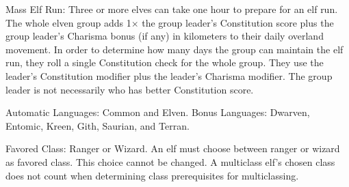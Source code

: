\begin{itemize*}
    \item Mass Elf Run: Three or more elves can take one hour to prepare for an elf run. The whole elven group adds 1\onehalf $\times$ the group leader's Constitution score plus the group leader's Charisma bonus (if any) in kilometers to their daily overland movement. In order to determine how many days the group can maintain the elf run, they roll a single Constitution check for the whole group. They use the leader's Constitution modifier plus the leader's Charisma modifier. The group leader is not necessarily who has better Constitution score.
    \item Automatic Languages: Common and Elven. Bonus Languages: Dwarven, Entomic, Kreen, Gith, Saurian, and Terran.
    \item Favored Class: Ranger or Wizard. An elf must choose between ranger or wizard as favored class. This choice cannot be changed. A multiclass elf's chosen class does not count when determining class prerequisites for multiclassing.
\end{itemize*}

